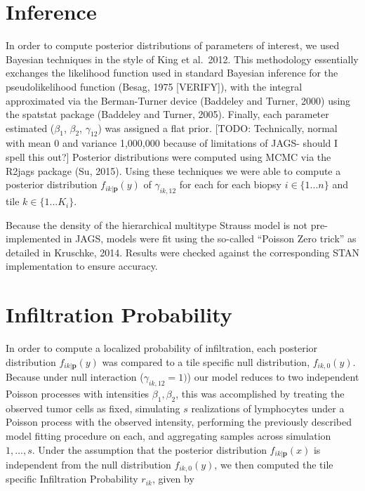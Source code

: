 \documentclass[
]{book}
\begin{document}
\hypertarget{inference}{%
\section{Inference}\label{inference}}

In order to compute posterior distributions of parameters of interest,
we used Bayesian techniques in the style of King et al.~2012. This
methodology essentially exchanges the likelihood function used in
standard Bayesian inference for the pseudolikelihood function (Besag,
1975 {[}VERIFY{]}), with the integral approximated via the Berman-Turner
device (Baddeley and Turner, 2000) using the spatstat package (Baddeley
and Turner, 2005). Finally, each parameter estimated (\(\beta_1\),
\(\beta_2\), \(\gamma_{12}\)) was assigned a flat prior. {[}TODO:
Technically, normal with mean 0 and variance 1,000,000 because of
limitations of JAGS- should I spell this out?{]} Posterior distributions
were computed using MCMC via the R2jags package (Su, 2015). Using these
techniques we were able to compute a posterior distribution
\(f_{ik | \mathbf{p}}(y)\) of \(\gamma_{ik,12}\) for each for each biopsy
\(i \in \{1...n\}\) and tile \(k \in \{1...K_i\}\).

Because the density of the hierarchical multitype Strauss model is not
pre-implemented in JAGS, models were fit using the so-called ``Poisson
Zero trick'' as detailed in Kruschke, 2014. Results were checked against
the corresponding STAN implementation to ensure accuracy.

\hypertarget{infiltration-probability}{%
\section{Infiltration Probability}\label{infiltration-probability}}

In order to compute a localized probability of infiltration, each
posterior distribution \(f_{ik | \mathbf{p}}(y)\) was compared to a tile
specific null distribution, \(f_{ik, 0}(y)\). Because under null
interaction (\(\gamma_{ik, 12} = 1)\)) our model reduces to two
independent Poisson processes with intensities \(\beta_1, \beta_2\), this
was accomplished by treating the observed tumor cells as fixed,
simulating \(s\) realizations of lymphocytes under a Poisson process with
the observed intensity, performing the previously described model
fitting procedure on each, and aggregating samples across simulation
\(1,...,s\). Under the assumption that the posterior distribution
\(f_{ik | \mathbf{p}}(x)\) is independent from the null distribution
\(f_{ik, 0}(y)\), we then computed the tile specific Infiltration
Probability \(r_{ik}\), given by
\end{document}
